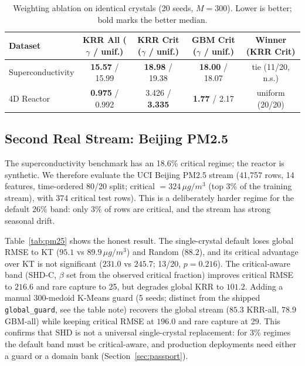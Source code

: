 \documentclass[11pt,a4paper]{article}
\begin{document}
\begin{table}[h]
\centering
\small
\caption{Weighting ablation on identical crystals (20 seeds, $M=300$). Lower is better; bold marks the better median.}
\label{tab:weights}
\begin{tabular}{lcccc}
\toprule
\textbf{Dataset} & \textbf{KRR All ($\gamma$ / unif.)} & \textbf{KRR Crit ($\gamma$ / unif.)} & \textbf{GBM Crit ($\gamma$ / unif.)} & \textbf{Winner (KRR Crit)} \\
\midrule
Superconductivity & \textbf{15.57} / 15.99 & \textbf{18.98} / 19.38 & \textbf{18.00} / 18.07 & tie (11/20, n.s.) \\
4D Reactor & \textbf{0.975} / 0.992 & 3.426 / \textbf{3.335} & \textbf{1.77} / 2.17 & uniform (20/20) \\
\bottomrule
\end{tabular}
\end{table}

\subsection{Second Real Stream: Beijing PM2.5}
\label{sec:pm25}

The superconductivity benchmark has an 18.6\% critical regime; the reactor is synthetic. We therefore evaluate the UCI Beijing PM2.5 stream \citep{liang2015pm25} (41,757 rows, 14 features, time-ordered 80/20 split; critical $=324\,\mu g/m^3$ (top 3\% of the training stream), with 374 critical test rows). This is a deliberately harder regime for the default 26\% band: only 3\% of rows are critical, and the stream has strong seasonal drift.

Table~\ref{tab:pm25} shows the honest result. The single-crystal default loses global RMSE to KT ($95.1$ vs $89.9\,\mu g/m^3$) and Random ($88.2$), and its critical advantage over KT is not significant ($231.0$ vs $245.7$; 13/20, $p=0.216$). The critical-aware band (SHD-C, $\beta$ set from the observed critical fraction) improves critical RMSE to $216.6$ and rare capture to 25, but degrades global KRR to $101.2$. Adding a manual 300-medoid K-Means guard (5 seeds; distinct from the shipped \texttt{global\_guard}, see the table note) recovers the global stream ($85.3$ KRR-all, $78.9$ GBM-all) while keeping critical RMSE at $196.0$ and rare capture at 29. This confirms that SHD is not a universal single-crystal replacement: for 3\% regimes the default band must be critical-aware, and production deployments need either a guard or a domain bank (Section~\ref{sec:passport}).
\end{document}
